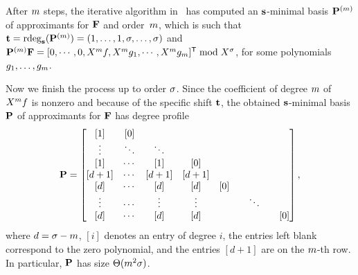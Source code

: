 \documentclass[preprint]{sig-alternate-05-2015}
\begin{document}
After $\rdim$ steps, the iterative algorithm in~\cite{BecLab94} has computed an
$\shifts$-minimal basis $\intBasis^{(\rdim)}$ of approximants for $\mat{F}$ and
order~$\rdim$, which is such that $\shifts[t] =
\rdeg[\shifts]{\intBasis^{(\rdim)}} = (1,\ldots,1,\order,\ldots,\order)$ and
$ \intBasis^{(\rdim)} \mat{F} =
  \trsp{[  0 ,
    \cdots ,
    0 ,
    X^{\rdim} f ,
    X^{\rdim} g_1 ,
    \cdots ,
    X^{\rdim} g_\rdim
  ]} \bmod X^\order$,
for some polynomials $g_1,\ldots,g_\rdim$.

Now we finish the process up to order $\order$. Since the coefficient of degree
$\rdim$ of $X^\rdim f$ is nonzero and because of the specific shift
$\shifts[t]$, the obtained $\shifts$-minimal basis $\intBasis$ of approximants
for $\mat{F}$ has degree profile
\[
  \intBasis =
  \begin{bmatrix}
    [1] & [0]                                                 \\
    \vdots & \ddots & \ddots                         \\
    [1] & \cdots & [1] & [0]                            \\
    [d+1] & \cdots & [d+1] & [d+1] \\
    [d] & \cdots & [d] & [d] & [0]                      \\
    \vdots & \cdots & \vdots & \vdots & & & \ddots   \\
    [d] & \cdots & [d] & [d] & &   &     &     & [0]
  \end{bmatrix},
\]
where $d = \order-\rdim$, $[i]$ denotes an entry of degree $i$, the entries
left blank correspond to the zero polynomial, and the entries $[d+1]$ are on
the $\rdim$-th row. In particular, $\intBasis$ has size $\Theta(\rdim^2
\order)$.
\end{document}
